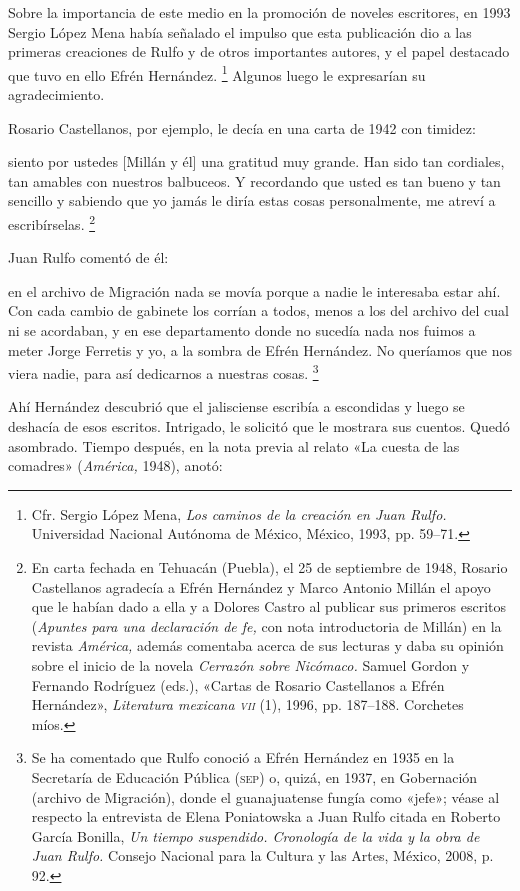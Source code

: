 \documentclass[14pt,twoside,final]{extbook} %
\let\oldfootnote\footnote
\renewcommand\footnote[1]{%
\oldfootnote{\hspace{1mm}#1}}
\begin{document}
Sobre la importancia de este medio en la promoción de noveles escritores, en 1993 Sergio López Mena había señalado el impulso que esta publicación dio a las primeras creaciones de Rulfo y de otros importantes autores, y el papel destacado que tuvo en ello Efrén Hernández.\footnote{Cfr. Sergio López Mena, \emph{Los caminos de la creación en Juan Rulfo.} Universidad Nacional Autónoma de México, México, 1993, pp. 59--71.} Algunos luego le expresarían su agradecimiento.

Rosario Castellanos, por ejemplo, le decía en una carta de 1942 con timidez:
\begin{quoting}
siento por ustedes [Millán y él] una gratitud muy grande. Han sido tan cordiales, tan amables con nuestros balbuceos. Y recordando que usted es tan bueno y tan sencillo y sabiendo que yo jamás le diría estas cosas personalmente, me atreví a escribírselas.\footnote{En carta fechada en Tehuacán (Puebla), el 25 de septiembre de 1948, Rosario Castellanos agradecía a Efrén Hernández y Marco Antonio Millán el apoyo que le habían dado a ella y a Dolores Castro al publicar sus primeros escritos (\emph{Apuntes para una declaración de fe,} con nota introductoria de Millán) en la revista \emph{América,} además comentaba acerca de sus lecturas y daba su opinión sobre el inicio de la novela \emph{Cerrazón sobre Nicómaco.} Samuel Gordon y Fernando Rodríguez (eds.), «Cartas de Rosario Castellanos a Efrén Hernández», \emph{Literatura mexicana \textsc{vii}} (1), 1996, pp. 187--188. Corchetes míos.}
\end{quoting}
Juan Rulfo comentó de él: 
\begin{quoting}
en el archivo de Migración nada se movía porque a nadie le interesaba estar ahí. Con cada cambio de gabinete los corrían a todos, menos a los del archivo del cual ni se acordaban, y en ese departamento donde no sucedía nada nos fuimos a meter Jorge Ferretis y yo, a la sombra de Efrén Hernández. No queríamos que nos viera nadie, para así dedicarnos a nuestras cosas.\footnote{Se ha comentado que Rulfo conoció a Efrén Hernández en 1935 en la Secretaría de Educación Pública (\textsc{sep}) o, quizá, en 1937, en Gobernación (archivo de Migración), donde el guanajuatense fungía como «jefe»; véase al respecto la entrevista de Elena Poniatowska a Juan Rulfo citada en Roberto García Bonilla, \emph{Un tiempo suspendido. Cronología de la vida y la obra de Juan Rulfo.} Consejo Nacional para la Cultura y las Artes, México, 2008, p. 92.}
\end{quoting}
Ahí Hernández descubrió que el jalisciense escribía a escondidas y luego se deshacía de esos escritos. Intrigado, le solicitó que le mostrara sus cuentos. Quedó asombrado. Tiempo después, en la nota previa al relato «La cuesta de las comadres» (\emph{América,} 1948), anotó:
\end{document}
